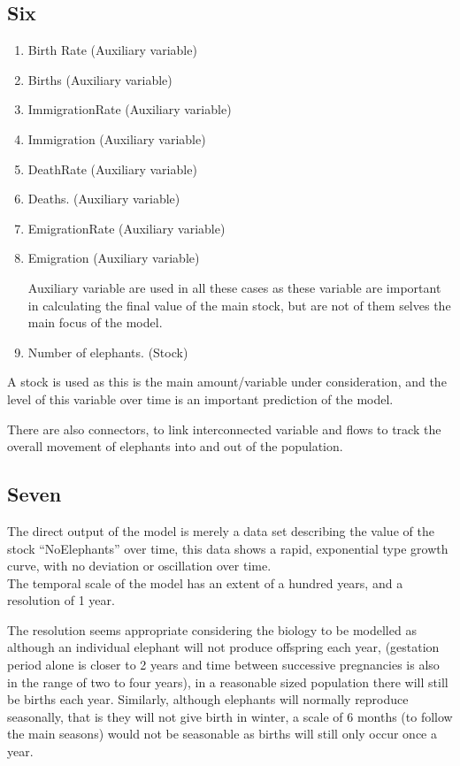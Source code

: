 \documentclass[]{article}
\begin{document}
\hypertarget{six}{%
\subsection{Six}\label{six}}

\begin{enumerate}
\def\labelenumi{\arabic{enumi}.}
\item
  Birth Rate (Auxiliary variable)
\item
  Births (Auxiliary variable)
\item
  ImmigrationRate (Auxiliary variable)
\item
  Immigration (Auxiliary variable)
\item
  DeathRate (Auxiliary variable)
\item
  Deaths. (Auxiliary variable)
\item
  EmigrationRate (Auxiliary variable)
\item
  Emigration (Auxiliary variable)

  Auxiliary variable are used in all these cases as these variable are
  important in calculating the final value of the main stock, but are
  not of them selves the main focus of the model.
\item
  Number of elephants. (Stock)
\end{enumerate}

A stock is used as this is the main amount/variable under consideration,
and the level of this variable over time is an important prediction of
the model.

There are also connectors, to link interconnected variable and flows to
track the overall movement of elephants into and out of the population.

\hypertarget{seven}{%
\subsection{Seven}\label{seven}}

The direct output of the model is merely a data set describing the value
of the stock ``NoElephants'' over time, this data shows a rapid,
exponential type growth curve, with no deviation or oscillation over
time.\\
The temporal scale of the model has an extent of a hundred years, and a
resolution of 1 year.

The resolution seems appropriate considering the biology to be modelled
as although an individual elephant will not produce offspring each year,
(gestation period alone is closer to 2 years and time between successive
pregnancies is also in the range of two to four years), in a reasonable
sized population there will still be births each year. Similarly,
although elephants will normally reproduce seasonally, that is they will
not give birth in winter, a scale of 6 months (to follow the main
seasons) would not be seasonable as births will still only occur once a
year.
\end{document}
